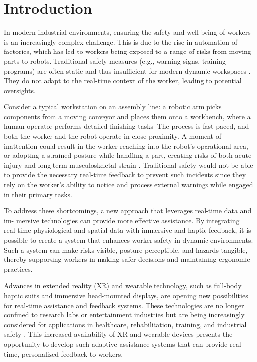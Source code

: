 \chapter{Introduction}
In modern industrial environments, ensuring the safety and well-being of workers is
an increasingly complex challenge. This is due to the rise in automation of factories,
which has led to workers being exposed to a range of risks from moving parts to robots.
Traditional safety measures (e.g., warning signs, training programs) are often static and
thus insufficient for modern dynamic workspaces \cite{robb2019vrtraining}. They do not
adapt to the real-time context of the worker, leading to potential oversights.

Consider a typical workstation on an assembly line: a robotic arm picks components
from a moving conveyor and places them onto a workbench, where a human operator
performs detailed finishing tasks. The process is fast-paced, and both the worker and
the robot operate in close proximity. A moment of inattention could result in the worker
reaching into the robot’s operational area, or adopting a strained posture while handling a
part, creating risks of both acute injury and long-term musculoskeletal strain \cite{punnett2004wrmsd}.
Traditional safety would not be able to provide the necessary real-time feedback to prevent such
incidents since they rely on the worker’s ability to notice and process external warnings
while engaged in their primary tasks.

To address these shortcomings, a new approach that leverages real-time data and im-
mersive technologies can provide more effective assistance. By integrating real-time
physiological and spatial data with immersive and haptic feedback, it is possible to create
a system that enhances worker safety in dynamic environments. Such a system can make
risks visible, posture perceptible, and hazards tangible, thereby supporting workers in
making safer decisions and maintaining ergonomic practices.

Advances in extended reality (XR) and wearable technology, such as full-body haptic
suits and immersive head-mounted displays, are opening new possibilities for real-time
assistance and feedback systems. These technologies are no longer confined to research
labs or entertainment industries but are being increasingly considered for applications
in healthcare, rehabilitation, training, and industrial safety \cite{palmarini2018ar}. This increased availability of
XR and wearable devices presents the opportunity to develop such adaptive assistance
systems that can provide real-time, personalized feedback to workers.

